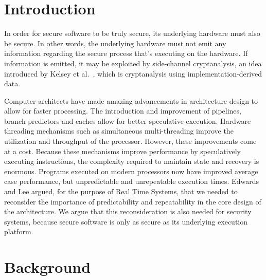 \documentclass[times, 10pt,twocolumn]{article}
\begin{document}
\section{Introduction}
In order for secure software to be truly secure, its underlying hardware must also be secure. In other words, the underlying hardware must not emit any information regarding the secure process that's executing on the hardware.  If information is emitted, it may be exploited by side-channel cryptanalysis, an idea introduced by Kelsey et al.~\cite{Kelsey98sidechannel}, which is cryptanalysis using implementation-derived data.

Computer architects have made amazing advancements in architecture design to allow for faster processing. The introduction and improvement of pipelines, branch predictors and caches allow for better speculative execution. Hardware threading mechanisms such as simultaneous multi-threading improve the utilization and throughput of the processor. However, these improvements come at a cost. Because these mechanisms improve performance by speculatively executing instructions, the complexity required to maintain state and recovery is enormous. Programs executed on modern processors now have improved average case performance, but unpredictable and unrepeatable execution times. Edwards and Lee\cite{edwards2007case} argued, for the purpose of Real Time Systems, that we needed to reconsider the importance of predictability and repeatability in the core design of the architecture. We argue that this reconsideration is also needed for security systems, because secure software is only as secure as its underlying execution platform. 



\section{Background}
\end{document}

